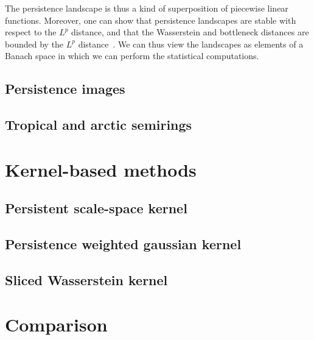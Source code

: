 \documentclass[a4paper,11pt,openany,extrafontsizes]{memoir}
\begin{document}
The persistence landscape is thus a kind of superposition of piecewise
linear functions. Moreover, one can show that persistence landscapes
are stable with respect to the $L^p$ distance, and that the
Wasserstein and bottleneck distances are bounded by the $L^p$
distance~\cite{bubenik_statistical_2015}. We can thus view the
landscapes as elements of a Banach space in which we can perform the
statistical computations.

\subsection{Persistence images}

\cite{adams_persistence_2017}

\subsection{Tropical and arctic semirings}

\cite{kalisnik_tropical_2018}

\section{Kernel-based methods}%
\label{sec:kernel-based-methods}

\subsection{Persistent scale-space kernel}

\cite{reininghaus_stable_2015,kwitt_statistical_2015}

\subsection{Persistence weighted gaussian kernel}

\cite{kusano_kernel_2017}

\subsection{Sliced Wasserstein kernel}

\cite{carriere_sliced_2017}

\section{Comparison}%
\label{sec:comparison}




\backmatter%

\printbibliography%
\end{document}
